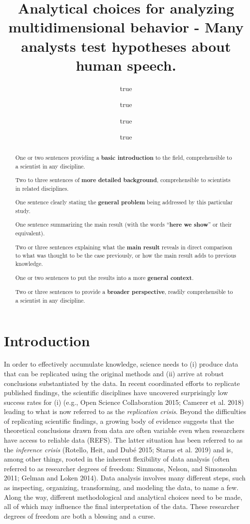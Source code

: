 \documentclass[
  12pt,
]{article}
\title{Analytical choices for analyzing multidimensional behavior - Many analysts test hypotheses about human speech.}
\author{true \and true \and true \and true}
\date{}
\begin{document}
\maketitle
\begin{abstract}
One or two sentences providing a \textbf{basic introduction} to the field, comprehensible to a scientist in any discipline.

Two to three sentences of \textbf{more detailed background}, comprehensible to scientists in related disciplines.

One sentence clearly stating the \textbf{general problem} being addressed by this particular study.

One sentence summarizing the main result (with the words ``\textbf{here we show}'' or their equivalent).

Two or three sentences explaining what the \textbf{main result} reveals in direct comparison to what was thought to be the case previously, or how the main result adds to previous knowledge.

One or two sentences to put the results into a more \textbf{general context}.

Two or three sentences to provide a \textbf{broader perspective}, readily comprehensible to a scientist in any discipline.
\end{abstract}

{
\setcounter{tocdepth}{2}
\tableofcontents
}
\hypertarget{introduction}{%
\section{Introduction}\label{introduction}}

In order to effectively accumulate knowledge, science needs to (i) produce data that can be replicated using the original methods and (ii) arrive at robust conclusions substantiated by the data.
In recent coordinated efforts to replicate published findings, the scientific disciplines have uncovered surprisingly low success rates for (i) (e.g., Open Science Collaboration 2015; Camerer et al. 2018) leading to what is now referred to as the \emph{replication crisis}.
Beyond the difficulties of replicating scientific findings, a growing body of evidence suggests that the theoretical conclusions drawn from data are often variable even when researchers have access to reliable data (REFS).
The latter situation has been referred to as the \emph{inference crisis} (Rotello, Heit, and Dubé 2015; Starns et al. 2019) and is, among other things, rooted in the inherent flexibility of data analysis (often referred to as researcher degrees of freedom: Simmons, Nelson, and Simonsohn 2011; Gelman and Loken 2014).
Data analysis involves many different steps, such as inspecting, organizing, transforming, and modeling the data, to name a few.
Along the way, different methodological and analytical choices need to be made, all of which may influence the final interpretation of the data.
These researcher degrees of freedom are both a blessing and a curse.
\end{document}
